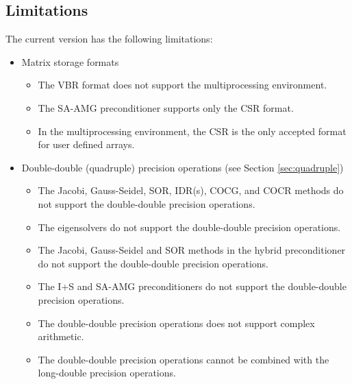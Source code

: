 \documentclass[a4paper]{article}
\begin{document}
\subsection{Limitations}
The current version has the following limitations:
\begin{itemize}

\item Matrix storage formats
\begin{itemize}
\item The VBR format does not support the multiprocessing environment.
\item The SA-AMG preconditioner supports only the CSR format. 
\item In the multiprocessing environment, the CSR is the only accepted
      format for user defined arrays.
\end{itemize}

\item Double-double (quadruple) precision operations (see Section \ref{sec:quadruple})
\begin{itemize}
\item The Jacobi, Gauss-Seidel, SOR, IDR(s), COCG, and COCR methods
      do not support the double-double precision operations.
\item The eigensolvers do not support the double-double precision operations.
\item The Jacobi, Gauss-Seidel and SOR methods in the hybrid preconditioner do not support the double-double precision operations.
\item The I+S and SA-AMG preconditioners do not support the double-double precision operations.
\item The double-double precision operations does not support complex arithmetic.
\item The double-double precision operations cannot be combined with the long-double precision operations.
\end{itemize}


\end{itemize}
\end{document}
